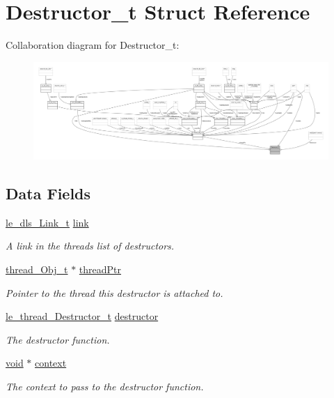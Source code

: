 \hypertarget{struct_destructor__t}{}\section{Destructor\+\_\+t Struct Reference}
\label{struct_destructor__t}


Collaboration diagram for Destructor\+\_\+t\+:
\nopagebreak
\begin{figure}[H]
\begin{center}
\leavevmode
\includegraphics[width=350pt]{struct_destructor__t__coll__graph}
\end{center}
\end{figure}
\subsection*{Data Fields}
\begin{DoxyCompactItemize}
\item 
\hyperlink{structle__dls___link__t}{le\+\_\+dls\+\_\+\+Link\+\_\+t} \hyperlink{struct_destructor__t_a9070a237487fb12ad197dfa45d49d4ac}{link}
\begin{DoxyCompactList}\small\item\em A link in the thread\textquotesingle{}s list of destructors. \end{DoxyCompactList}\item 
\hyperlink{structthread___obj__t}{thread\+\_\+\+Obj\+\_\+t} $\ast$ \hyperlink{struct_destructor__t_a805fb3ff162a9bedf2c9d9749edc362c}{thread\+Ptr}
\begin{DoxyCompactList}\small\item\em Pointer to the thread this destructor is attached to. \end{DoxyCompactList}\item 
\hyperlink{le__thread_8h_ac0c2e7ab0a7da9fc00c2c546bfc6b0fd}{le\+\_\+thread\+\_\+\+Destructor\+\_\+t} \hyperlink{struct_destructor__t_ac7088d79a06b59e163548b55b954e40b}{destructor}
\begin{DoxyCompactList}\small\item\em The destructor function. \end{DoxyCompactList}\item 
\hyperlink{_t_e_m_p_l_a_t_e__cdef_8h_ac9c84fa68bbad002983e35ce3663c686}{void} $\ast$ \hyperlink{struct_destructor__t_a95910cc77fb897555b31a181ec071d7f}{context}
\begin{DoxyCompactList}\small\item\em The context to pass to the destructor function. \end{DoxyCompactList}\end{DoxyCompactItemize}


